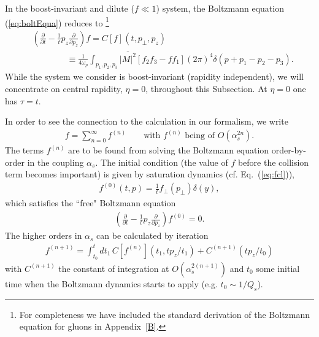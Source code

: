 \documentclass[onecolumn,showpacs,nobibnotes,nofootinbib,12pt,aps,prd,showpacs,notitlepage,nofootinbib,preprintnumbers,amsmath,amssymb]{article}
\def\eq#1{{Eq.~(\ref{#1})}}
\newcommand{\as}{\alpha_s}
\begin{document}
In the boost-invariant and dilute ($f \ll 1$) system, the Boltzmann
equation (\ref{eq:boltEqua}) reduces to
\cite{Mueller:1999pi}\footnote{For completeness we have included the
  standard derivation of the Boltzmann equation for gluons in
  Appendix~\ref{B}.}
\begin{align}
  &\left(\frac{\partial}{\partial t} - \frac{1}{t} p_z
    \frac{\partial}{\partial p_z}\right)
  f= C[f](t,p_\perp,p_z)\nonumber\\
  &\qquad\qquad\equiv\frac{1}{4
    \omega_p}\int_{p_1,p_2,p_3}\overline{|M|^2}[f_2f_3-f f_1](2\pi)^4
  \delta(p+p_1-p_2-p_3).
\end{align}
While the system we consider is boost-invariant (rapidity
independent), we will concentrate on central rapidity, $\eta =0$,
throughout this Subsection. At $\eta =0$ one has $\tau = t$.  

In order to see the connection to the calculation in our formalism, we
write
\begin{align}
  f=\sum\limits_{n=0}^\infty f^{(n)} \qquad\text{with $f^{(n)}$ being
    of $O(\alpha_s^{2n})$}.
\end{align}
The terms $f^{(n)}$ are to be found from solving the Boltzmann
equation order-by-order in the coupling $\as$. The initial condition
(the value of $f$ before the collision term becomes important) is
given by saturation dynamics (cf. \eq{eq:fcl}),
\begin{align}\label{init_cond}
  f^{(0)}(t,p)=\frac{1}{t} f_\perp(p_\perp) \delta(y),
\end{align}
which satisfies the ``free" Boltzmann equation 
\begin{align}
  \left(\frac{\partial}{\partial t} - \frac{1}{t} p_z
    \frac{\partial}{\partial p_z}\right) f^{(0)}=0.
\end{align}
The higher orders in $\as$ can be calculated by iteration
\begin{align}\label{eq:fn1}
  f^{(n+1)}=\int_{t_0}^t dt_1 \, C[f^{(n)}](t_1,t p_z/t_1)+C^{(n+1)}(t
  p_z/t_0)
\end{align}
with $C^{(n+1)}$ the constant of integration at $O(\alpha_s^{2(n+1)})$
and $t_0$ some initial time when the Boltzmann dynamics starts to
apply (e.g. $t_0 \sim 1/Q_s$).
\end{document}
